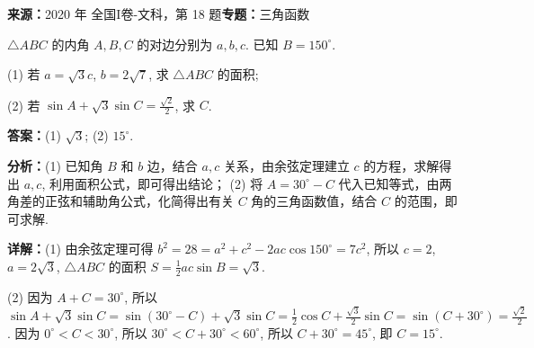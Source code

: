 \begin{question}[points=12]
\textbf{来源：}2020 年 全国I卷-文科，第 18 题\quad \textbf{专题：}三角函数\par
$\triangle ABC$ 的内角 $A, B, C$ 的对边分别为 $a, b, c$. 已知 $B=150^\circ$.



(1) 若 $a=\sqrt{3}c$, $b=2\sqrt{7}$, 求 $\triangle ABC$ 的面积;



(2) 若 $\sin A + \sqrt{3}\sin C = \frac{\sqrt{2}}{2}$, 求 $C$.
\begin{solution}
\textbf{答案：}(1) $\sqrt{3}$; (2) $15^\circ$.

\textbf{分析：}(1) 已知角 $B$ 和 $b$ 边，结合 $a,c$ 关系，由余弦定理建立 $c$ 的方程，求解得出 $a,c$, 利用面积公式，即可得出结论； (2) 将 $A=30^\circ - C$ 代入已知等式，由两角差的正弦和辅助角公式，化简得出有关 $C$ 角的三角函数值，结合 $C$ 的范围，即可求解.

\textbf{详解：}(1) 由余弦定理可得 $b^2 = 28 = a^2 + c^2 - 2ac\cos150^\circ = 7c^2$, 所以 $c=2$, $a=2\sqrt{3}$, $\triangle ABC$ 的面积 $S = \frac{1}{2}ac\sin B = \sqrt{3}$.

(2) 因为 $A+C=30^\circ$, 所以 $\sin A + \sqrt{3}\sin C = \sin(30^\circ - C) + \sqrt{3}\sin C = \frac{1}{2}\cos C + \frac{\sqrt{3}}{2}\sin C = \sin(C+30^\circ) = \frac{\sqrt{2}}{2}$. 因为 $0^\circ < C < 30^\circ$, 所以 $30^\circ < C+30^\circ < 60^\circ$, 所以 $C+30^\circ = 45^\circ$, 即 $C=15^\circ$.
\end{solution}
\end{question}


